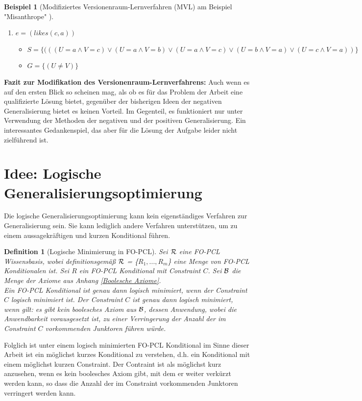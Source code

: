 \documentclass[a4paper, 11pt]{book}
\newtheorem{Def}{Definition }[section]
\newtheorem{Bsp}{Beispiel}[section]
\begin{document}
\begin{Bsp}[Modifiziertes Versionenraum-Lernverfahren (MVL) am Beispiel "{}Misanthrope"{} ]
\begin{itemize}
\begin{enumerate}
\begin{itemize}
		\end{itemize}
		\item $ e = (likes(c,a)) $
		\begin{itemize}
			\item $ S = \{(((U = a \land V = c) \lor (U = a \land V = b) \lor (U = a \land V = c) \lor (U = b \land V = a) \lor (U = c \land V = a))\}$ 
			\item $ G = \{(U \neq V)\} $
		\end{itemize}	
	\end{enumerate}
\end{itemize}
\end{Bsp}
\textbf{{\large Fazit zur Modifikation des Versionenraum-Lernverfahrens:}} \label{Fazit VRL} 
Auch wenn es auf den ersten Blick so scheinen mag, als ob es für das Problem der Arbeit eine qualifizierte Lösung bietet, gegenüber der bisherigen Ideen der negativen Generalisierung bietet es keinen Vorteil. Im Gegenteil, es funktioniert nur unter Verwendung der Methoden der negativen und der positiven Generalisierung. Ein interessantes Gedankenspiel, das aber für die Lösung der Aufgabe leider nicht zielführend ist. 



\section{Idee: Logische Generalisierungsoptimierung} 


	Die logische Generalisierungsoptimierung kann kein eigenständiges Verfahren zur Generalisierung sein. Sie kann lediglich andere Verfahren unterstützen, um zu einem aussagekräftigen und kurzen Konditional führen.
\begin{Def}[Logische Minimierung in FO-PCL] \label{Logische Min} 
	Sei $\cal{R}$ eine FO-PCL Wissensbasis, wobei definitionsgemäß $\cal{R}$  = \{$ R_1, ..., R_m $\} eine Menge von FO-PCL Konditionalen ist. Sei $ R $ ein FO-PCL Konditional mit Constraint $ C $. Sei $ \cal B $ die Menge der Axiome aus Anhang \ref{Boolesche Axiome}.\\
	Ein FO-PCL Konditional ist genau dann logisch minimiert, wenn der Constraint $ C $ logisch minimiert ist. Der Constraint $ C $ ist genau dann logisch minimiert, wenn gilt: es gibt kein boolesches Axiom aus $\cal B  $, dessen Anwendung, wobei die Anwendbarkeit vorausgesetzt ist, zu einer Verringerung der Anzahl der im Constraint $ C $ vorkommenden Junktoren führen würde.
\end{Def}
Folglich ist unter einem logisch minimierten FO-PCL Konditional im Sinne dieser Arbeit ist ein möglichst kurzes Konditional zu verstehen, d.h. ein Konditional mit einem möglichst kurzen Constraint. Der Contraint ist als möglichst kurz anzusehen, wenn es kein boolesches Axiom gibt, mit dem er weiter verkürzt werden kann, so dass die Anzahl der im Constraint vorkommenden Junktoren verringert werden kann. 
\end{document}
